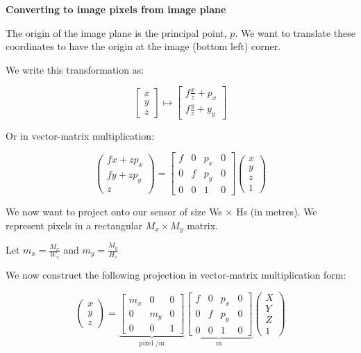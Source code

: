 \documentclass{beamer}
\begin{document}
\begin{frame}[allowframebreaks]
\textbf{Converting to image pixels from image plane}

The origin of the image plane is the principal point, $p$. We want to translate these coordinates to have the origin at the image (bottom left) corner.

We write this transformation as:

\[
  \begin{bmatrix}
    x \\ y \\ z
  \end{bmatrix} \mapsto
  \begin{bmatrix}
    f \frac{x}{z} + p_{x} \\
    f \frac{y}{z} + y_{y}
  \end{bmatrix}
\]

Or in vector-matrix multiplication:

\[
  \begin{pmatrix}
    f x + zp_{x} \\
    f y + zp_{y}\\
    z
  \end{pmatrix} =
  \begin{bmatrix}
    f & 0 & p_{x} & 0 \\
    0 & f & p_{y} & 0 \\
    0 & 0 & 1 & 0
  \end{bmatrix}
  \begin{pmatrix}
    x \\ y \\ z \\ 1
  \end{pmatrix}
\]

We now want to project onto our sensor of size Ws $\times$ Hs (in metres). We represent pixels in a rectangular $M_{x} \times M_{y}$ matrix.

Let $m_{x} = \frac{M_{x}}{W_{s}}$ and $m_{y} = \frac{M_{y}}{H_{s}}$

We now construct the following projection in vector-matrix multiplication form:

\[
  \begin{pmatrix}
    x \\y \\z
  \end{pmatrix}
  = \underbrace{\begin{bmatrix}
    m_{x} & 0 & 0\\
    0 & m_{y} & 0\\
    0 & 0 & 1
  \end{bmatrix}}_{\text{pixel /m}}
  \underbrace{\begin{bmatrix}
    f & 0 & p_{x} & 0\\
    0 & f & p_{y} & 0\\
    0 & 0 & 1 & 0
  \end{bmatrix}}_{\text{m}}
  \begin{pmatrix}
    X \\Y\\ Z\\1
  \end{pmatrix}
\]


\end{frame}
\end{document}
